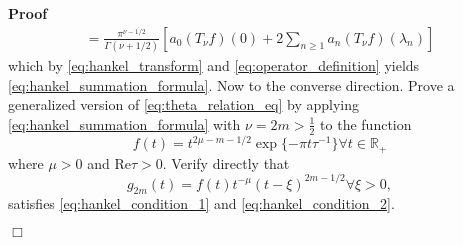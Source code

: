 \documentclass{article}
\newenvironment{proof}{\noindent\textbf{Proof\ }}{\hspace*{\fill}$\Box$\medskip}
\begin{document}
\begin{proof}
\begin{equation}
\begin{array}{l}
      = \frac{\pi^{\nu - 1 / 2}}{\Gamma (\nu + 1 / 2)}  \left[ a_0 (T_{\nu} f)
      (0) + 2 \sum_{n \geq 1} a_n (T_{\nu} f) (\lambda_n) \right]
    \end{array} \label{eq:hankel_proof_2}
  \end{equation}
  which by \eqref{eq:hankel_transform} and \eqref{eq:operator_definition}
  yields \eqref{eq:hankel_summation_formula}. Now to the converse direction.
  Prove a generalized version of \eqref{eq:theta_relation_eq} by applying
  \eqref{eq:hankel_summation_formula} with $\nu = 2 m > \frac{1}{2}$ to the
  function
  \begin{equation}
    f (t) = t^{2 \mu - m - 1 / 2} \exp \{- \pi t \tau^{- 1} \} \forall t \in
    \mathbb{R}_+ \label{eq:test_function}
  \end{equation}
  where $\mu > 0$ and $\mathrm{Re} \tau > 0$. Verify directly that
  \begin{equation}
    g_{2 m} (t) = f (t) t^{- \mu}  (t - \xi)^{2 m - 1 / 2} \forall \xi > 0,
    \label{eq:test_satisfies_1}
  \end{equation}
  satisfies \eqref{eq:hankel_condition_1} and \eqref{eq:hankel_condition_2}.
  

\end{proof}
\end{document}
